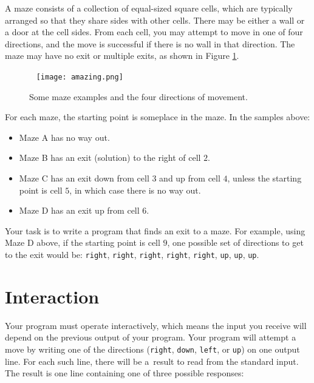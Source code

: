 
A maze consists of a collection of equal-sized square cells, which are typically arranged so that they
share sides with other cells.
There may be either a wall or a door at the cell sides.
From each cell, you may attempt to move in one of four directions, and the move is successful
if there is no wall in that direction.
The maze may have no exit or multiple exits, as shown in Figure \ref{fig:amazing:maze}.

\begin{figure}[!h]
\begin{center}
	~\hfill
    \texttt{[image: amazing.png]}
	\hfill ~
    \caption{\label{fig:amazing:maze}Some maze examples and the four directions of movement.}
\end{center}
\end{figure}

For each maze, the starting point is someplace in the maze. In the samples above:

\vspace{-8pt}
\begin{itemize}
\itemsep=-2pt
\item Maze A has no way out.
\item Maze B has an exit (solution) to the right of cell $2$.
\item Maze C has an exit down from cell $3$ and up from cell $4$, unless the starting point is cell $5$, in which case there is no way out.
\item Maze D has an exit up from cell $6$.
\end{itemize}

Your task is to write a program that finds an exit to a maze.
For example, using Maze D above, if the starting point is cell $9$, one possible set of directions to get to
the exit would be: \texttt{right}, \texttt{right}, \texttt{right}, \texttt{right}, \texttt{right}, 
\texttt{up}, \texttt{up}, \texttt{up}.


\section*{Interaction}

Your program must operate interactively, which means the input you receive
will depend on the previous output of your program.
Your program will attempt a move by writing one of the directions
(\texttt{right}, \texttt{down}, \texttt{left}, or \texttt{up}) on one output line.
For each such line, there will be a~result to read from the standard
input. The result is one line containing one of three possible responses:


